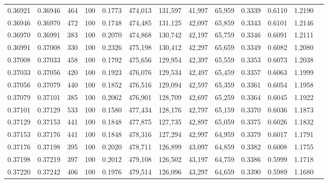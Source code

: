 \begin{tabular}{rrrrrrrrrrrrr}
0.36921 & 0.36946 &    464 & 100 &                                     0.1773 & 474,013 & 131,597 &  41,997 &  65,959 & 0.3339 & 0.6110 & 1.2190 \\
0.36946 & 0.36970 &    472 & 100 &                                     0.1748 & 474,485 & 131,125 &  42,097 &  65,859 & 0.3343 & 0.6101 & 1.2146 \\
0.36970 & 0.36991 &    383 & 100 &                                     0.2070 & 474,868 & 130,742 &  42,197 &  65,759 & 0.3346 & 0.6091 & 1.2111 \\
0.36991 & 0.37008 &    330 & 100 &                                     0.2326 & 475,198 & 130,412 &  42,297 &  65,659 & 0.3349 & 0.6082 & 1.2080 \\
0.37008 & 0.37033 &    458 & 100 &                                     0.1792 & 475,656 & 129,954 &  42,397 &  65,559 & 0.3353 & 0.6073 & 1.2038 \\
0.37033 & 0.37056 &    420 & 100 &                                     0.1923 & 476,076 & 129,534 &  42,497 &  65,459 & 0.3357 & 0.6063 & 1.1999 \\
0.37056 & 0.37079 &    440 & 100 &                                     0.1852 & 476,516 & 129,094 &  42,597 &  65,359 & 0.3361 & 0.6054 & 1.1958 \\
0.37079 & 0.37101 &    385 & 100 &                                     0.2062 & 476,901 & 128,709 &  42,697 &  65,259 & 0.3364 & 0.6045 & 1.1922 \\
0.37101 & 0.37129 &    533 & 100 &                                     0.1580 & 477,434 & 128,176 &  42,797 &  65,159 & 0.3370 & 0.6036 & 1.1873 \\
0.37129 & 0.37153 &    441 & 100 &                                     0.1848 & 477,875 & 127,735 &  42,897 &  65,059 & 0.3375 & 0.6026 & 1.1832 \\
0.37153 & 0.37176 &    441 & 100 &                                     0.1848 & 478,316 & 127,294 &  42,997 &  64,959 & 0.3379 & 0.6017 & 1.1791 \\
0.37176 & 0.37198 &    395 & 100 &                                     0.2020 & 478,711 & 126,899 &  43,097 &  64,859 & 0.3382 & 0.6008 & 1.1755 \\
0.37198 & 0.37219 &    397 & 100 &                                     0.2012 & 479,108 & 126,502 &  43,197 &  64,759 & 0.3386 & 0.5999 & 1.1718 \\
0.37220 & 0.37242 &    406 & 100 &                                     0.1976 & 479,514 & 126,096 &  43,297 &  64,659 & 0.3390 & 0.5989 & 1.1680 \\

\end{tabular}
